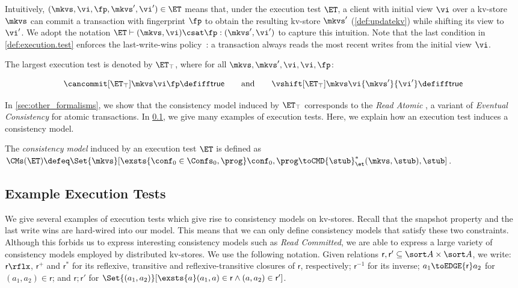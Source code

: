 %
\noindent 
Intuitively, \((\mkvs, \vi, \fp, \mkvs', \vi') \in \ET\) means that, under the execution test \(\ET\),
a client with initial view \(\vi\) over a kv-store \(\mkvs\) can commit a transaction with 
fingerprint \(\fp\) to obtain the resulting kv-store \(\mkvs'\) (\cref{def:updatekv}) while shifting its view
to \(\vi'\). We adopt the notation \(\ET \vdash (\mkvs, \vi) \csat \fp: (\mkvs', \vi')\) to capture this intuition. 
Note that the last condition in \cref{def:execution.test} enforces the last-write-wins
policy~\cite{vogels:2009:ec:1435417.1435432}: 
a transaction always reads the most recent writes from the initial view \(\vi\).  

The largest execution test is denoted by \(\ET_{\top}\), where for all \(\mkvs, \mkvs', \vi, \vi, \fp\):%

\spaceshrink{-10pt}
{\displaymathfont
\[
	\cancommit[\ET_{\top}] \mkvs \vi \fp \defiff \mathsf{true}
	\qquad  \text{and} \qquad 
	\vshift[\ET_{\top}] \mkvs \vi {\mkvs'} {\vi'} \defiff \mathsf{true}
\]%
\normalsize}%
\spaceshrink{-12pt}

\noindent
In \cref{sec:other_formalisms}, we show that the consistency model induced by \(\ET_{\top}\) 
corresponds to the \emph{Read Atomic} \cite{ramp}, a variant of \emph{Eventual 
Consistency} \cite{ev_transactions} for atomic transactions. 
In \cref{subsec:cm_examples}, we give many examples of execution tests. 
Here, we explain how an execution test induces a consistency model.

\spaceshrink{-3pt}
\begin{definition}
\label{def:cm}
The \emph{consistency model} induced by an execution test \(\ET\) is defined as 
\(
\CMs(\ET) \defeq 
\Set{\mkvs}[ 
\exsts{\conf_0 \in \Confs_0,\prog}
\conf_0,\prog \toCMD{\stub}_{\et}^{*} (\mkvs, \stub),\stub
]
\).
\end{definition}
\spaceshrink{-3pt}



\subsection{Example Execution Tests}
\label{subsec:cm_examples}
We give several examples of execution tests which give rise to consistency
models on kv-stores.
Recall that the snapshot property and the last write wins are hard-wired into our model. 
This means that we can only define  consistency models that satisfy these two constraints. 
Although this forbids us to express interesting consistency models such as \emph{Read Committed}, we are able to express a large variety of consistency models employed by distributed kv-stores.
We use the following  notation. 
Given relations \(\mathsf r, \mathsf r' \subseteq \sort A \times \sort A\),
we write:  \(\mathsf r\rflx\), \(\mathsf r^+\) and \(\mathsf r^*\) for its reflexive, transitive and reflexive-transitive closures of \(\mathsf r\), respectively;
\(\mathsf r^{-1}\) for its inverse;
\(a_1 \toEDGE{\mathsf r} a_2\) for \((a_1, a_2) \in \mathsf r\);
and \( \mathsf r; \mathsf r'\) for \( \Set{(a_1,a_2)}[\exsts{a} (a_1,a) \in \mathsf r\land (a,a_2) \in \mathsf r']\).

